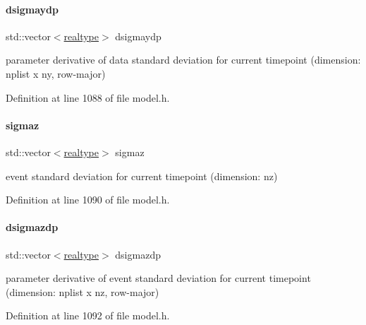 \mbox{\label{classamici_1_1_model_ac27fda47fffca46aa720e7df432edab4}} 
\paragraph{\texorpdfstring{dsigmaydp}{dsigmaydp}}
{\footnotesize\ttfamily std\+::vector$<$\mbox{\hyperlink{namespaceamici_a1bdce28051d6a53868f7ccbf5f2c14a3}{realtype}}$>$ dsigmaydp}

parameter derivative of data standard deviation for current timepoint (dimension\+: nplist x ny, row-\/major) 

Definition at line 1088 of file model.\+h.

\mbox{\label{classamici_1_1_model_adc3c5ee1620b079cd34137010873f500}} 
\paragraph{\texorpdfstring{sigmaz}{sigmaz}}
{\footnotesize\ttfamily std\+::vector$<$\mbox{\hyperlink{namespaceamici_a1bdce28051d6a53868f7ccbf5f2c14a3}{realtype}}$>$ sigmaz}

event standard deviation for current timepoint (dimension\+: nz) 

Definition at line 1090 of file model.\+h.

\mbox{\label{classamici_1_1_model_aae09fc37aa5eb7b2ba0e9bb335940fd5}} 
\paragraph{\texorpdfstring{dsigmazdp}{dsigmazdp}}
{\footnotesize\ttfamily std\+::vector$<$\mbox{\hyperlink{namespaceamici_a1bdce28051d6a53868f7ccbf5f2c14a3}{realtype}}$>$ dsigmazdp}

parameter derivative of event standard deviation for current timepoint (dimension\+: nplist x nz, row-\/major) 

Definition at line 1092 of file model.\+h.

